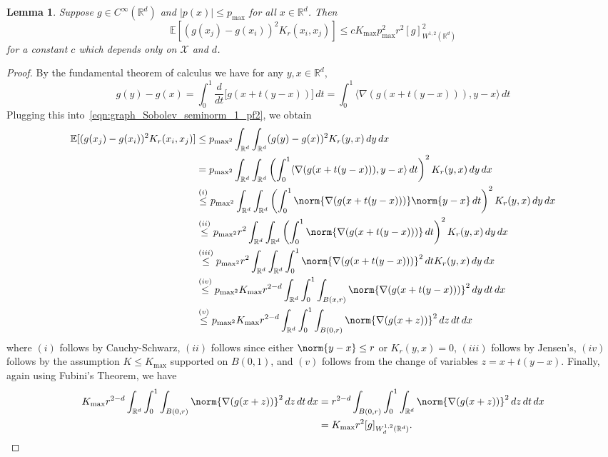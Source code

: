 \documentclass{article}
\newcommand{\Reals}{\mathbb{R}}
\newcommand{\abs}[1]{\left \lvert #1 \right \rvert}
\newcommand{\1}{\mathbf{1}}
\newcommand{\Rd}{\Reals^d}
\newcommand{\Xset}{\mathcal{X}}
\newcommand{\Ebb}{\mathbb{E}}
\newcommand{\dotp}[2]{\langle #1, #2 \rangle}
\theoremstyle{alden}
\theoremstyle{aldenthm}
\newtheorem{lemma}{Lemma}
\theoremstyle{definition}
\theoremstyle{remark}
\begin{document}
\begin{lemma}
	\label{lem:expected_first_order_seminorm}
	Suppose $g \in C^{\infty}(\Rd)$ and $\abs{p(x)} \leq p_{\max}$ for all $x \in \Rd$. Then
	\begin{equation*}
	\Ebb[(g(x_j) - g(x_i))^2K_r(x_i,x_j)] \leq c K_{\max} p_{\max}^2 r^2 [g]_{W^{1,2}(\Rd)}^2
	\end{equation*}
	for a constant $c$ which depends only on $\Xset$ and $d$.
\end{lemma}
\begin{proof}
	By the fundamental theorem of calculus we have for any $y,x \in \Rd$,
	\begin{equation*}
	g(y) - g(x) = \int_{0}^{1} \frac{d}{dt}\bigl[g(x + t(y - x))\bigr] \,dt = \int_{0}^{1} \dotp{\nabla(g(x + t(y - x)))}{y - x} \,dt
	\end{equation*}
	Plugging this into~\eqref{eqn:graph_Sobolev_seminorm_1_pf2}, we obtain
	\begin{align*}
	\Ebb[(g(x_j) - g(x_i))^2K_r(x_i,x_j)] & \leq p_{\max^2} \int_{\Rd} \int_{\Rd} (g(y) - g(x))^2 K_r(y,x) \,dy \,dx\\
	& = p_{\max^2} \int_{\Rd} \int_{\Rd} \left(\int_{0}^{1} \dotp{\nabla(g(x + t(y - x)))}{y - x} \,dt\right)^2 K_r(y,x) \,dy \,dx \\
	& \overset{(i)}{\leq} p_{\max^2} \int_{\Rd} \int_{\Rd} \left(\int_{0}^{1} \norm{\nabla(g(x + t(y - x)))}\norm{y - x} \,dt\right)^2 K_r(y,x) \,dy \,dx \\
	& \overset{(ii)}{\leq} p_{\max^2} r^2\int_{\Rd} \int_{\Rd} \left(\int_{0}^{1} \norm{\nabla(g(x + t(y - x)))}\,dt\right)^2 K_r(y,x) \,dy \,dx \\
	& \overset{(iii)}{\leq} p_{\max^2} r^2\int_{\Rd} \int_{\Rd} \int_{0}^{1} \norm{\nabla(g(x + t(y - x)))}^2 \,dt K_r(y,x) \,dy \,dx \\
	& \overset{(iv)}{\leq} p_{\max^2} K_{\max} r^{2 - d}\int_{\Rd} \int_{0}^{1} \int_{B(x,r)} \norm{\nabla(g(x + t(y - x)))}^2 \,dy \,dt \,dx \\
	& \overset{(v)}{\leq}  p_{\max^2} K_{\max} r^{2 - d}\int_{\Rd} \int_{0}^{1} \int_{B(0,r)} \norm{\nabla(g(x + z))}^2  \,dz \,dt \,dx
	\end{align*}
	where $(i)$ follows by Cauchy-Schwarz, $(ii)$ follows since either $\norm{y - x} \leq r$ or $K_r(y,x) = 0$, $(iii)$ follows by Jensen's, $(iv)$ follows by the assumption $K \leq K_{\max}$ supported on $B(0,1)$, and $(v)$ follows from the change of variables $z = x + t(y - x)$. Finally, again using Fubini's Theorem, we have
	\begin{align*}
	K_{\max} r^{2 - d}\int_{\Rd} \int_{0}^{1} \int_{B(0,r)} \norm{\nabla(g(x + z))}^2  \,dz \,dt \,dx & = r^{2 - d}\int_{B(0,r)} \int_{0}^{1} \int_{\Rd} \norm{\nabla(g(x + z))}^2  \,dz \,dt \,dx \\
	& = K_{\max} r^2 [g]_{W_d^{1,2}(\Rd)}.
	\end{align*}
\end{proof}
\end{document}
